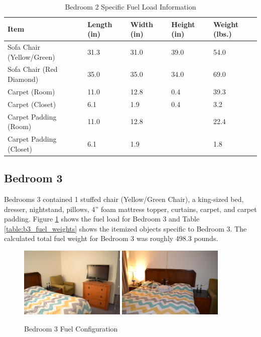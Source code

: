 \documentclass[12pt,oneside]{book}
\begin{document}
\begin{table}[H]
\centering
\begin{tabular}{|L{0.3\textwidth}|C{0.08\textwidth}|C{0.08\textwidth}|C{0.08\textwidth}|C{0.08\textwidth}|}
\hline
Item 						&Length (in) 	&Width (in) 	&Height (in) 	&Weight (lbs.) 	\\ \hline \hline
Sofa Chair (Yellow/Green) 	&31.3 			&31.0 			&39.0 			&54.0 			\\ \hline
Sofa Chair (Red Diamond) 	&35.0 			&35.0			&34.0			&69.0 			\\ \hline
Carpet (Room) 				&11.0			&12.8			&0.4			&39.3			\\ \hline
Carpet (Closet)				&6.1			&1.9			&0.4			&3.2			\\ \hline
Carpet Padding (Room)		&11.0			&12.8			&				&22.4			\\ \hline
Carpet Padding (Closet)		&6.1			&1.9			&				&1.8			\\ \hline	  
\end{tabular}
\caption{Bedroom 2 Specific Fuel Load Information}
\label{table:b2_fuel_weights}
\end{table}

\clearpage

\subsection*{Bedroom 3}
Bedrooms 3 contained 1 stuffed chair (Yellow/Green Chair), a king-sized bed, dresser, nightstand, pillows, 4'' foam mattress topper, curtains, carpet, and carpet padding. Figure \ref{figure:Bed3_fuel} shows the fuel load for Bedroom 3 and Table \ref{table:b3_fuel_weights} shows the itemized objects specific to Bedroom 3. The calculated total fuel weight for Bedroom 3 was roughly 498.3 pounds.

\begin{figure}[H]
\centering
\includegraphics[width=0.45\textwidth]{../0_Images/Fuel/Bedroom_3_1.jpg}
\includegraphics[width=0.45\textwidth]{../0_Images/Fuel/Bedroom_3_2.jpg}
\caption{Bedroom 3 Fuel Configuration}
\label{figure:Bed3_fuel}
\end{figure}
\end{document}
